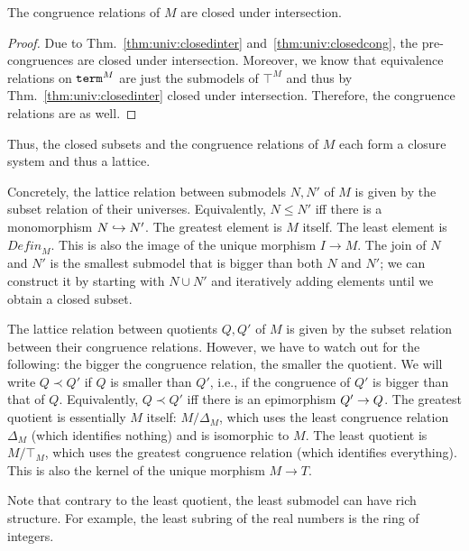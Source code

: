 \begin{theorem}
The congruence relations of $M$ are closed under intersection.
\end{theorem}
\begin{proof}
Due to Thm.~\ref{thm:univ:closedinter} and~\ref{thm:univ:closedcong}, the pre-congruences are closed under intersection.
Moreover, we know that equivalence relations on $\mathtt{term}^M$ are just the submodels of $\top^M$ and thus by Thm.~\ref{thm:univ:closedinter} closed under intersection.
Therefore, the congruence relations are as well.
\end{proof}

Thus, the closed subsets and the congruence relations of $M$ each form a closure system and thus a lattice.

Concretely, the lattice relation between submodels $N,N'$ of $M$ is given by the subset relation of their universes.
Equivalently, $N\leq N'$ iff there is a monomorphism $N\hookrightarrow N'$.
The greatest element is $M$ itself.
The least element is $\mathit{Defin}_M$. This is also the image of the unique morphism $I\to M$.
The join of $N$ and $N'$ is the smallest submodel that is bigger than both $N$ and $N'$; we can construct it by starting with $N\cup N'$ and iteratively adding elements until we obtain a closed subset.

The lattice relation between quotients $Q,Q'$ of $M$ is given by the subset relation between their congruence relations.
However, we have to watch out for the following: the bigger the congruence relation, the smaller the quotient.
We will write $Q\prec Q'$ if $Q$ is smaller than $Q'$, i.e., if the congruence of $Q'$ is bigger than that of $Q$.
Equivalently, $Q\prec Q'$ iff there is an epimorphism $Q'\rightarrow Q$.
The greatest quotient is essentially $M$ itself: $M/\Delta_M$, which uses the least congruence relation $\Delta_M$ (which identifies nothing) and is isomorphic to $M$.
The least quotient is $M/\top_M$, which uses the greatest congruence relation (which identifies everything).
This is also the kernel of the unique morphism $M\to T$.

Note that contrary to the least quotient, the least submodel can have rich structure.
For example, the least subring of the real numbers is the ring of integers.

